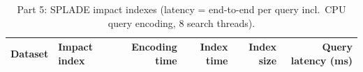 \begin{table}[ht]\centering\small
\begin{tabular}{llrrrr}\toprule
Dataset & Impact index & Encoding time & Index time & Index size & Query latency (ms) \\ \midrule

\bottomrule\end{tabular}
\caption{Part 5: SPLADE impact indexes (latency = end-to-end per query incl.\ CPU query encoding, 8 search threads).}\label{tab:p5idx}\end{table}
